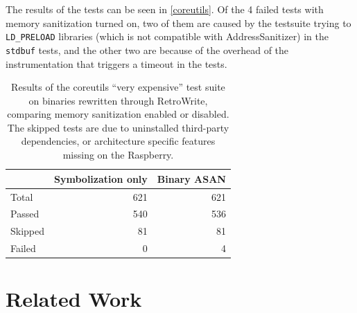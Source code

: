 \documentclass[a4paper,11pt,oneside]{report}
\newcommand{\sysname}{RetroWrite\xspace}
\begin{document}
The results of the tests can be seen in \autoref{coreutils}. Of the 4 failed
tests with memory sanitization turned on, two of them are caused by the
testsuite trying to \texttt{LD\_PRELOAD} libraries (which is not compatible
with AddressSanitizer) in the \texttt{stdbuf} tests, and the other two are
because of the overhead of the instrumentation that triggers a timeout in the
tests.


\begin{table}
\centering
\begin{tabular}{lrr}
\toprule
	& \textbf{Symbolization only} & \textbf{Binary ASAN} \\
\toprule
	Total              & 621 & 621 \\
	Passed              & 540  & 536  \\
	Skipped              & 81  & 81  \\
	Failed              & 0  & 4  \\
\bottomrule
\end{tabular}
\caption{Results of the coreutils ``very expensive'' test suite on binaries rewritten through \sysname, comparing memory sanitization enabled or disabled. The skipped tests are due to uninstalled third-party dependencies, or architecture specific features missing on the Raspberry.}
\label{coreutils}
\end{table}



\chapter{Related Work}



\end{document}

